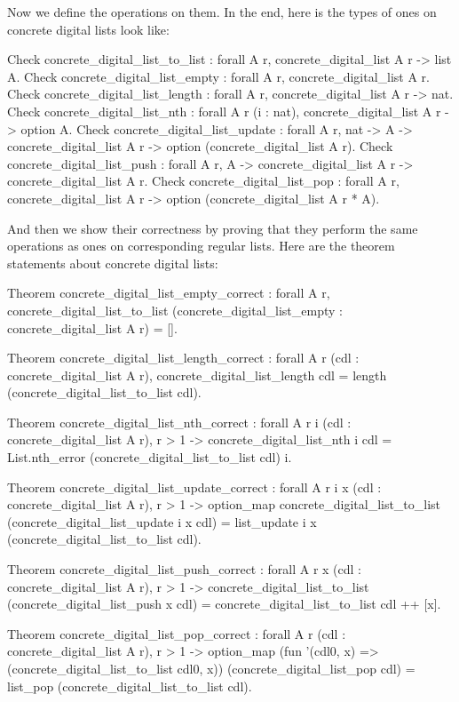 \documentclass{article}
\begin{document}
Now we define the operations on them. In the end, here is the types of ones on concrete digital lists look like:

\begin{coq}
Check concrete_digital_list_to_list : forall {A} {r}, concrete_digital_list A r -> list A.
Check concrete_digital_list_empty : forall {A} {r}, concrete_digital_list A r.
Check concrete_digital_list_length : forall {A} {r}, concrete_digital_list A r -> nat.
Check concrete_digital_list_nth : forall {A} {r} (i : nat), concrete_digital_list A r -> option A.
Check concrete_digital_list_update : forall {A} {r}, nat -> A -> concrete_digital_list A r ->
  option (concrete_digital_list A r).
Check concrete_digital_list_push : forall {A} {r}, A -> concrete_digital_list A r -> concrete_digital_list A r.
Check concrete_digital_list_pop : forall {A} {r}, concrete_digital_list A r ->
  option (concrete_digital_list A r * A).
\end{coq}

And then we show their correctness by proving that they perform the same operations as ones on corresponding regular lists. Here are the theorem statements about concrete digital lists:

\begin{coq}
Theorem concrete_digital_list_empty_correct :
  forall {A r},
  concrete_digital_list_to_list (concrete_digital_list_empty : concrete_digital_list A r) = [].

Theorem concrete_digital_list_length_correct :
  forall {A r} (cdl : concrete_digital_list A r),
  concrete_digital_list_length cdl = length (concrete_digital_list_to_list cdl).

Theorem concrete_digital_list_nth_correct :
  forall {A r} i (cdl : concrete_digital_list A r),
  r > 1 ->
  concrete_digital_list_nth i cdl = List.nth_error (concrete_digital_list_to_list cdl) i.

Theorem concrete_digital_list_update_correct :
  forall {A r} i x (cdl : concrete_digital_list A r),
  r > 1 ->
  option_map concrete_digital_list_to_list (concrete_digital_list_update i x cdl) =
    list_update i x (concrete_digital_list_to_list cdl).

Theorem concrete_digital_list_push_correct :
  forall {A r} x (cdl : concrete_digital_list A r),
  r > 1 ->
  concrete_digital_list_to_list (concrete_digital_list_push x cdl) =
    concrete_digital_list_to_list cdl ++ [x].

Theorem concrete_digital_list_pop_correct :
  forall {A r} (cdl : concrete_digital_list A r),
  r > 1 ->
  option_map
    (fun '(cdl0, x) => (concrete_digital_list_to_list cdl0, x))
    (concrete_digital_list_pop cdl) = list_pop (concrete_digital_list_to_list cdl).
\end{coq}
\end{document}
